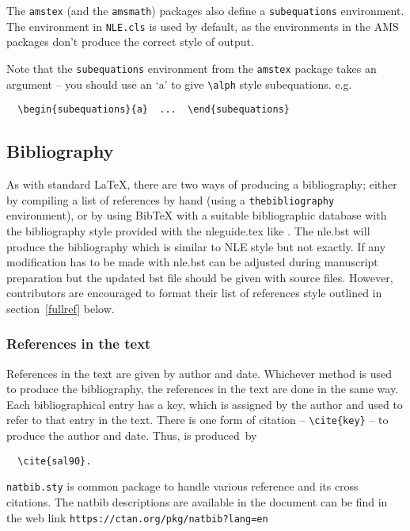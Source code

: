 \documentclass{nle}
\begin{document}
The \verb"amstex" (and the \verb"amsmath") packages also define a
\verb"subequations" environment.  The environment in \verb"NLE.cls" is used
by default, as the environments in the AMS packages don't produce the correct
style of output.

Note that the \verb"subequations" environment from the \verb"amstex" package
takes an argument -- you should use an `a' to give \verb"\alph" style
subequations. e.g.
\begin{verbatim}
  \begin{subequations}{a}  ...  \end{subequations}
\end{verbatim}

\subsection{Bibliography}

As with standard \LaTeX, there are two ways of producing a bibliography;
either by compiling a list of references by hand (using a
\verb"thebibliography" environment), or by using BibTeX with a suitable
bibliographic database with the bibliography style provided with the nleguide.tex like \verb"". The nle.bst will produce the bibliography which is similar to NLE style but not exactly. If any modification has to be made with nle.bst can be adjusted during manuscript preparation but the updated bst file should be given with source files. However, contributors are encouraged to format
their list of references style outlined in section~\ref{fullref}
below.

\subsubsection{References in the text}

References in the text are given by author and date.
Whichever method is used to produce the bibliography, the references in
the text are done in the same way. Each bibliographical entry has a key,
which is assigned by the author and used to refer to that entry in the
text. There is one form of citation -- \verb"\cite{key}" -- to produce the
author and date. Thus, \cite{sal90} is produced~by
\begin{verbatim}
  \cite{sal90}.
\end{verbatim}

\verb"natbib.sty" is common package to handle various reference and its cross citations. The natbib descriptions are available in the document can be find in the web link \verb"https://ctan.org/pkg/natbib?lang=en"
\end{document}

